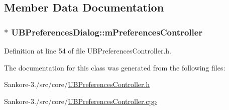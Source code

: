\subsection{Member Data Documentation}
\hypertarget{class_u_b_preferences_dialog_a358fe8042f8cf2cabfaa6fe0fa8a47ec}{
\subsubsection[{m\-Preferences\-Controller}]{$\ast$ U\-B\-Preferences\-Dialog\-::m\-Preferences\-Controller\hspace{0.3cm}{\ttfamily [protected]}}}\label{d4/d16/class_u_b_preferences_dialog_a358fe8042f8cf2cabfaa6fe0fa8a47ec}


Definition at line 54 of file U\-B\-Preferences\-Controller.\-h.



The documentation for this class was generated from the following files\-:\begin{DoxyCompactItemize}
\item 
Sankore-\/3./src/core/\hyperlink{_u_b_preferences_controller_8h}{U\-B\-Preferences\-Controller.\-h}\item 
Sankore-\/3./src/core/\hyperlink{_u_b_preferences_controller_8cpp}{U\-B\-Preferences\-Controller.\-cpp}\end{DoxyCompactItemize}
